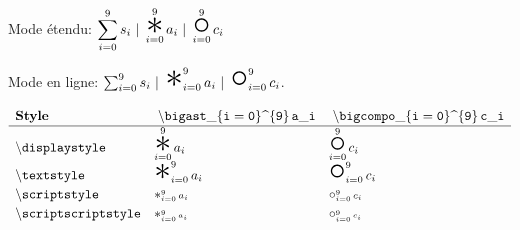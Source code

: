 \documentclass[varwidth, border = 8pt]{standalone}
\newcommand\exasep{\kern3pt | \kern3pt}
\newcommand\sumexa{\sum_{i = 0}^{9} s_i}
\newcommand\astexa{\bigast_{i = 0}^{9} a_i}
\newcommand\compoexa{\bigcompo_{i = 0}^{9} c_i}
\newcommand{\simpletest}{\astexa}
\newcommand{\verbtest}%
           {\mathmacro{bigast}\_\{i = 0\}%
            \text{\textasciicircum}\{9\} \, a\_i}
\newcommand{\simpletestbis}{\compoexa}
\newcommand{\verbtestbis}%
           {\mathmacro{bigcompo}\_\{i = 0\}%
            \text{\textasciicircum}\{9\} \, c\_i}
\newcommand{\testmathstyle}{
  \[
    \renewcommand{\arraystretch}{1.2}%
    \begin{array}{lll}
        \textbf{Style}
      & \mathtt{\verbtest}
      & \mathtt{\verbtestbis}
      \\ \hline
        \txtmacro{displaystyle}
      & \displaystyle \simpletest
      & \displaystyle \simpletestbis
      \\
        \txtmacro{textstyle}
      & \textstyle \simpletest
      & \textstyle \simpletestbis
      \\
        \txtmacro{scriptstyle}
      & \scriptstyle \simpletest
      & \scriptstyle \simpletestbis
      \\
        \txtmacro{scriptscriptstyle}
      & \scriptscriptstyle \simpletest
      & \scriptscriptstyle \simpletestbis
    \end{array}
  \]
}
\begin{document}
Mode étendu:
$\displaystyle \sumexa \exasep \astexa \exasep \compoexa$

Mode en ligne:
$\sumexa \exasep \astexa \exasep \compoexa$.

\testmathstyle
\end{document}
